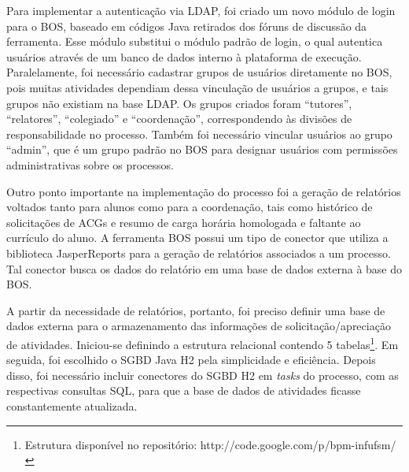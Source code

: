 \documentclass[12pt]{article}
\begin{document}

Para implementar a autenticação via LDAP, foi criado um novo módulo de login para o BOS, baseado em códigos Java retirados dos fóruns de discussão da ferramenta. Esse módulo substitui o módulo padrão de login, o qual autentica usuários através de um banco de dados interno à plataforma de execução. Paralelamente, foi necessário cadastrar grupos de usuários diretamente no BOS, pois muitas atividades dependiam dessa vinculação de usuários a grupos, e tais grupos não existiam na base LDAP. Os grupos criados foram “tutores”, “relatores”, “colegiado” e “coordenação”, correspondendo às divisões de responsabilidade no processo. Também foi necessário vincular usuários ao grupo “admin”, que é um grupo padrão no BOS para designar usuários com permissões administrativas sobre os processos.

Outro ponto importante na implementação do processo foi a geração de relatórios voltados tanto para alunos como para a coordenação, tais como histórico de solicitações de ACGs e resumo de carga horária homologada e faltante ao currículo do aluno. A ferramenta BOS possui um tipo de conector que utiliza a biblioteca JasperReports para a geração de relatórios associados a um processo. Tal conector busca os dados do relatório em uma base de dados externa à base do BOS.

A partir da necessidade de relatórios, portanto, foi preciso definir uma base de dados externa para o armazenamento das informações de solicitação/apreciação de atividades. Iniciou-se definindo a estrutura relacional contendo 5 tabelas\footnote{Estrutura disponível no repositório: http://code.google.com/p/bpm-infufsm/}.
Em seguida, foi escolhido o SGBD Java H2 pela simplicidade e eficiência. Depois disso, foi necessário incluir conectores do SGBD H2 em \emph{tasks} do processo, com as respectivas consultas SQL, para que a base de dados de atividades ficasse constantemente atualizada.
\end{document}
